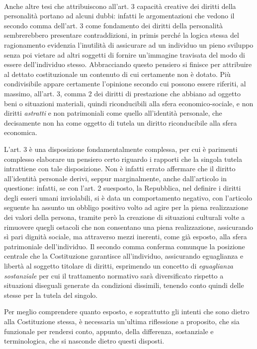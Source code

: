 \\Anche altre tesi che attribuiscono all'art. 3 capacità creative dei diritti della personalità portano ad alcuni dubbi: infatti le argomentazioni che vedono il secondo comma dell'art. 3 come fondamento dei diritti della personalità sembrerebbero presentare contraddizioni, in primis perché la logica stessa del ragionamento evidenzia l'inutilità di assicurare ad un individuo un pieno sviluppo senza poi vietare ad altri soggetti di fornire un'immagine travisata del modo di essere dell'individuo stesso. Abbracciando questo pensiero si finisce per attribuire al dettato costituzionale un contenuto di cui certamente non è dotato. Più condivisibile appare certamente l'opinione secondo cui possono essere riferiti, al massimo, all'art. 3, comma 2 dei diritti di prestazione che abbiano ad oggetto beni o situazioni materiali, quindi riconducibili alla sfera economico-sociale, e non diritti \textit{astratti} e non patrimoniali come quello all'identità personale, che decisamente non ha come oggetto di tutela un diritto riconducibile alla sfera economica.

L'art. 3 è una disposizione fondamentalmente complessa, per cui è parimenti complesso elaborare un pensiero certo riguardo i rapporti che la singola tutela intrattiene con tale disposizione. Non è infatti errato affermare che il diritto all'identità personale derivi, seppur marginalmente, anche dall'articolo in questione: infatti, se con l'art. 2 suesposto, la Repubblica, nel definire i diritti degli esseri umani inviolabili, si è data un comportamento negativo, con l'articolo seguente ha assunto un obbligo positivo volto ad agire per la piena realizzazione dei valori della persona, tramite però la creazione di situazioni culturali volte a rimuovere quegli ostacoli che non consentano una piena realizzazione, assicurando sì pari dignità sociale, ma attraverso mezzi inerenti, come già esposto, alla sfera patrimoniale dell'individuo. Il secondo comma conferma comunque la posizione centrale che la Costituzione garantisce all'individuo, assicurando eguaglianza e libertà al soggetto titolare di diritti, esprimendo un concetto di \textit{eguaglianza sostanziale} per cui il trattamento normativo sarà diversificato rispetto a situazioni diseguali generate da condizioni dissimili, tenendo conto quindi delle stesse per la tutela del singolo. 

Per meglio comprendere quanto esposto, e soprattutto gli intenti che sono dietro alla Costituzione stessa, è necessaria un'ultima riflessione a proposito, che sia funzionale per rendersi conto, appunto, della differenza, sostanziale e terminologica, che si nasconde dietro questi disposti.

